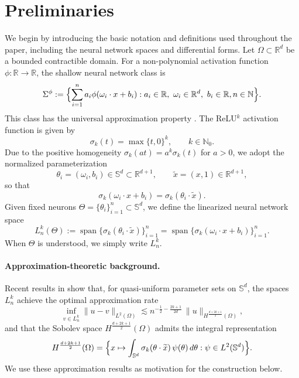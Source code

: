 \documentclass[pdflatex,sn-mathphys-num]{sn-jnl}
\numberwithin{equation}{section}
\numberwithin{theorem}{section}
\numberwithin{table}{section}
\numberwithin{figure}{section}
\begin{document}
\section{Preliminaries}\label{sec:prelim}

We begin by introducing the basic notation and definitions used throughout the paper, including the neural network spaces and differential forms. Let $\Omega\subset\mathbb  R  ^d$ be a bounded contractible domain. For a non-polynomial activation function $\phi:\mathbb  R  \to\mathbb  R  $, the shallow neural network class is
\begin{equation}
\Sigma^{\phi}
:=
\Bigl\{\sum_{i=1}^n a_i\phi(\omega_i\cdot x+b_i): a_i\in\mathbb  R  ,\ \omega_i\in\mathbb  R  ^d,\ b_i\in\mathbb  R ,n\in \mathbb N \Bigr\}.
\end{equation}
This class has the universal approximation property \cite{hornik1989multilayer}. The ReLU$^k$ activation function is given by
\begin{equation}
\sigma_k(t)=\max\{t,0\}^k,
\qquad k\in\mathbb N_0.
\end{equation}
Due to the positive homogeneity $\sigma_k(at)=a^k\sigma_k(t)$ for $a>0$, we adopt the normalized parameterization
\begin{equation}
\theta_i=(\omega_i,b_i)\in \mathbb S ^d\subset\mathbb  R  ^{d+1},
\qquad \widetilde x=(x,1)\in\mathbb  R  ^{d+1},
\end{equation}
so that
\begin{equation}
\sigma_k(\omega_i\cdot x+b_i)=\sigma_k(\theta_i\cdot\widetilde x).
\end{equation}
Given fixed neurons $\Theta=\{\theta_i\}_{i=1}^n\subset\mathbb S ^d$, we define the linearized neural network space
\begin{equation}
L_n^k(\Theta)
:=
\operatorname{span}\{\sigma_k(\theta_i\cdot \widetilde x)\}_{i=1}^n
=\operatorname{span}\{\sigma_k(\omega_i\cdot x+b_i)\}_{i=1}^n.
\end{equation}
When $\Theta$ is understood, we simply write $L_n^k$.

\paragraph{Approximation-theoretic background.}
Recent results in \cite{liu2025integral} show that, for quasi-uniform parameter sets on $\mathbb S ^d$, the spaces $L_n^k$ achieve the optimal approximation rate
\begin{equation}
\inf_{v\in L_n^k}\|u-v\|_{L^2(\Omega)}
\lesssim
n^{-\frac12-\frac{2k+1}{2d}}\,\|u\|_{H^{\frac{d+2k+1}{2}}(\Omega)},
\end{equation}
and that the Sobolev space $H^{\frac{d+2k+1}{2}}(\Omega)$ admits the integral representation
\begin{equation}
H^{\frac{d+2k+1}{2}}(\Omega)
=
\Bigl\{x\mapsto\int_{\mathbb S ^d}\sigma_k(\theta\cdot\widetilde x)\,\psi(\theta)\,d\theta:
\psi\in L^2(\mathbb S ^d)\Bigr\}.
\end{equation}
We use these approximation results as motivation for the construction below.
\end{document}
